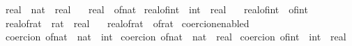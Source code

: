 \begin{isabellebody}
\isanewline
{}\isamarkupfalse%
\ real\ {\isacharcolon}{\kern0pt}{\isacharcolon}{\kern0pt}\ {\isachardoublequoteopen}nat\ {\isasymRightarrow}\ real{\isachardoublequoteclose}\isanewline
\ \ \ {\isachardoublequoteopen}real\ {\isasymequiv}\ of{\isacharunderscore}{\kern0pt}nat{\isachardoublequoteclose}\isanewline
\isanewline
{}\isamarkupfalse%
\ real{\isacharunderscore}{\kern0pt}of{\isacharunderscore}{\kern0pt}int\ {\isacharcolon}{\kern0pt}{\isacharcolon}{\kern0pt}\ {\isachardoublequoteopen}int\ {\isasymRightarrow}\ real{\isachardoublequoteclose}\isanewline
\ \ \ {\isachardoublequoteopen}real{\isacharunderscore}{\kern0pt}of{\isacharunderscore}{\kern0pt}int\ {\isasymequiv}\ of{\isacharunderscore}{\kern0pt}int{\isachardoublequoteclose}\isanewline
\isanewline
{}\isamarkupfalse%
\ real{\isacharunderscore}{\kern0pt}of{\isacharunderscore}{\kern0pt}rat\ {\isacharcolon}{\kern0pt}{\isacharcolon}{\kern0pt}\ {\isachardoublequoteopen}rat\ {\isasymRightarrow}\ real{\isachardoublequoteclose}\isanewline
\ \ \ {\isachardoublequoteopen}real{\isacharunderscore}{\kern0pt}of{\isacharunderscore}{\kern0pt}rat\ {\isasymequiv}\ of{\isacharunderscore}{\kern0pt}rat{\isachardoublequoteclose}\isanewline
\isanewline
{}\isamarkupfalse%
\ {\isacharbrackleft}{\kern0pt}{\isacharbrackleft}{\kern0pt}coercion{\isacharunderscore}{\kern0pt}enabled{\isacharbrackright}{\kern0pt}{\isacharbrackright}{\kern0pt}\isanewline
\isanewline
{}\isamarkupfalse%
\ {\isacharbrackleft}{\kern0pt}{\isacharbrackleft}{\kern0pt}coercion\ {\isachardoublequoteopen}of{\isacharunderscore}{\kern0pt}nat\ {\isacharcolon}{\kern0pt}{\isacharcolon}{\kern0pt}\ nat\ {\isasymRightarrow}\ int{\isachardoublequoteclose}{\isacharbrackright}{\kern0pt}{\isacharbrackright}{\kern0pt}\isanewline
{}\isamarkupfalse%
\ {\isacharbrackleft}{\kern0pt}{\isacharbrackleft}{\kern0pt}coercion\ {\isachardoublequoteopen}of{\isacharunderscore}{\kern0pt}nat\ {\isacharcolon}{\kern0pt}{\isacharcolon}{\kern0pt}\ nat\ {\isasymRightarrow}\ real{\isachardoublequoteclose}{\isacharbrackright}{\kern0pt}{\isacharbrackright}{\kern0pt}\isanewline
{}\isamarkupfalse%
\ {\isacharbrackleft}{\kern0pt}{\isacharbrackleft}{\kern0pt}coercion\ {\isachardoublequoteopen}of{\isacharunderscore}{\kern0pt}int\ {\isacharcolon}{\kern0pt}{\isacharcolon}{\kern0pt}\ int\ {\isasymRightarrow}\ real{\isachardoublequoteclose}{\isacharbrackright}{\kern0pt}{\isacharbrackright}{\kern0pt}\isanewline
\isanewline

\end{isabellebody}
